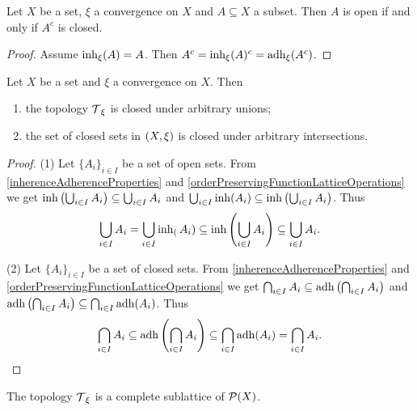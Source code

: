 \begin{lemma}
Let $X$ be a set, $\xi$ a convergence on $X$ and $A\subseteq X$ a subset. Then $A$ is open \textup{if and only if} $A^c$ is closed.
\end{lemma}
\begin{proof}
Assume $\operatorname{inh}_\xi(A) = A$. Then $A^c = \operatorname{inh}_\xi(A)^c = \operatorname{adh}_\xi(A^c)$.
\end{proof}

\begin{lemma} \label{completeClosureTopology}
Let $X$ be a set and $\xi$ a convergence on $X$. Then
\begin{enumerate}
\item the topology $\operatorname{\mathcal{T}}_\xi$ is closed under arbitrary unions;
\item the set of closed sets in $\left( X,\xi \right)$ is closed under arbitrary intersections.
\end{enumerate}
\end{lemma}
\begin{proof}
(1) Let $\{A_i\}_{i\in I}$ be a set of open sets. From \ref{inherenceAdherenceProperties} and \ref{orderPreservingFunctionLatticeOperations} we get $\operatorname{inh}\left(\bigcup_{i\in I}A_i\right) \subseteq \bigcup_{i\in I}A_i$ and $\bigcup_{i\in I}\operatorname{inh}(A_i) \subseteq \operatorname{inh}\left(\bigcup_{i\in I} A_i\right)$. Thus
\[ \bigcup_{i\in I}A_i  = \bigcup_{i\in I}\operatorname{inh}_(A_i) \subseteq \operatorname{inh}\left(\bigcup_{i\in I} A_i\right) \subseteq \bigcup_{i\in I}A_i. \]

(2) Let $\{A_i\}_{i\in I}$ be a set of closed sets. From \ref{inherenceAdherenceProperties} and \ref{orderPreservingFunctionLatticeOperations} we get $\bigcap_{i\in I}A_i \subseteq \operatorname{adh}\left(\bigcap_{i\in I}A_i\right)$ and $\operatorname{adh}\left(\bigcap_{i\in I} A_i\right)\subseteq \bigcap_{i\in I}\operatorname{adh}(A_i)$. Thus
\[ \bigcap_{i\in I}A_i \subseteq \operatorname{adh}\left(\bigcap_{i\in I}A_i\right) \subseteq \bigcap_{i\in I}\operatorname{adh}(A_i) = \bigcap_{i\in I}A_i. \]
\end{proof}
\begin{corollary}
The topology $\operatorname{\mathcal{T}}_\xi$ is a complete sublattice of $\operatorname{\mathcal{P}}(X)$.
\end{corollary}

